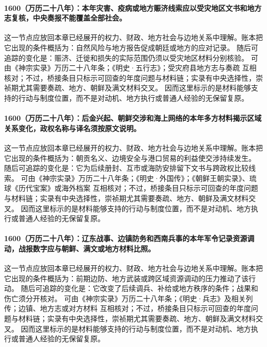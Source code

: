\paragraph{1600（万历二十八年）：本年灾害、疫病或地方赈济线索应以受灾地区文书和地方志复核，中央奏报不能覆盖全部社会。} 这一节点应放回本章已经展开的权力、财政、地方社会与边地关系中理解。账本把它出现的条件概括为：自然风险与地方报告促成朝廷或地方的应对记录。 随后可追踪的变化是：赈济、迁徙和损失的实际范围仍须以受灾地区材料分别核验。 可由《神宗实录》万历二十八年条；《明史·五行志》；受灾府县地方志与奏疏 互相核对；不过，桥接条目只标示可回查的年度问题与材料链；实录有中央选择性，崇祯期尤其需要奏疏、地方、朝鲜及满文材料交叉。 因而这里标示的是材料能够支持的行动与制度位置，而不是对动机、地方执行或普通人经验的无保留复原。

\paragraph{1600（万历二十八年）：后金兴起、朝鲜交涉和海上网络的本年多方材料揭示区域关系变化，政权名称与译名须按原文说明。} 这一节点应放回本章已经展开的权力、财政、地方社会与边地关系中理解。账本把它出现的条件概括为：朝贡名义、边境安全与港口贸易的利益使交涉持续发生。 随后可追踪的变化是：它为后续册封、互市或海防安排留下文书与跨政权比较线索。 可由《神宗实录》万历二十八年条；《明史·外国传》；《朝鲜王朝实录》、琉球《历代宝案》或海外档案 互相核对；不过，桥接条目只标示可回查的年度问题与材料链；实录有中央选择性，崇祯期尤其需要奏疏、地方、朝鲜及满文材料交叉。 因而这里标示的是材料能够支持的行动与制度位置，而不是对动机、地方执行或普通人经验的无保留复原。

\paragraph{1600（万历二十八年）：辽东战事、边镇防务和西南兵事的本年军令记录资源调动，战报数字应与朝鲜、满文或地方材料比照。} 这一节点应放回本章已经展开的权力、财政、地方社会与边地关系中理解。账本把它出现的条件概括为：前期边防、地方武装或跨区域资源调动的压力推动了该行动。 随后可追踪的变化是：它改变了后续调兵、补给或地方秩序的条件；战果和伤亡须分开核对。 可由《神宗实录》万历二十八年条；《明史·兵志》及相关列传；边镇、地方志或对方材料 互相核对；不过，桥接条目只标示可回查的年度问题与材料链；实录有中央选择性，崇祯期尤其需要奏疏、地方、朝鲜及满文材料交叉。 因而这里标示的是材料能够支持的行动与制度位置，而不是对动机、地方执行或普通人经验的无保留复原。


